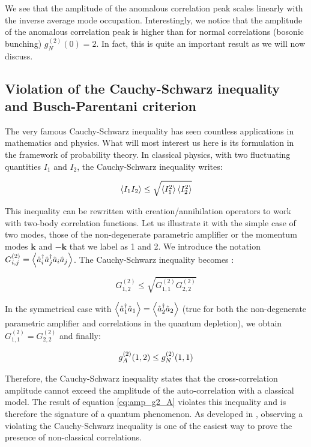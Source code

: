 \noindent We see that the amplitude of the anomalous correlation peak scales linearly with the inverse average mode occupation. Interestingly, we notice that the amplitude of the anomalous correlation peak is higher than for normal correlations (bosonic bunching) $g^{(2)}_N (0)=2$. In fact, this is quite an important result as we will now discuss.

\subsection{Violation of the Cauchy-Schwarz inequality and Busch-Parentani criterion}

\label{sec:cs_inequality}

The very famous Cauchy-Schwarz inequality has seen countless applications in mathematics and physics. What will most interest us here is its formulation in the framework of probability theory. In classical physics, with two fluctuating quantities $I_1$ and $I_2$, the Cauchy-Schwarz inequality writes:

\begin{equation}
    \left\langle I_1 I_2\right\rangle \leq \sqrt{\left\langle I_1^2\right\rangle \left\langle I_2^2\right\rangle}
\end{equation}

This inequality can be rewritten with creation/annihilation operators to work with two-body correlation functions. Let us illustrate it with the simple case of two modes, those of the non-degenerate parametric amplifier or the momentum modes $\bm{k}$ and $-\bm{k}$ that we label as 1 and 2. We introduce the notation $G^{(2)}_{i,j} = \left\langle\hat{a}_i^{\dagger} \hat{a}_j^{\dagger} \hat{a}_i \hat{a}_j\right\rangle$. The Cauchy-Schwarz inequality becomes \cite{kheruntsyan2012violation,walls2008}:

\begin{equation}
    G^{(2)}_{1,2} \leq \sqrt{G^{(2)}_{1,1} G^{(2)}_{2,2} }
\end{equation}

In the symmetrical case with $\left\langle\hat{a}^{\dagger}_1 \hat{a}_1\right\rangle=\left\langle\hat{a}^{\dagger}_2 \hat{a}_2\right\rangle$ (true for both the non-degenerate parametric amplifier and \kmk correlations in the quantum depletion), we obtain $G^{(2)}_{1,1}=G^{(2)}_{2,2}$ and finally:

\begin{equation}
    g^{(2)}_A (1,2) \leq g^{(2)}_N (1,1)
\end{equation}


Therefore, the Cauchy-Schwarz inequality states that the cross-correlation amplitude cannot exceed the amplitude of the auto-correlation with a classical model. The result of equation \ref{eq:amp_g2_A} violates this inequality and is therefore the signature of a quantum phenomenon. As developed in \cite{kheruntsyan2012violation}, observing a violating the Cauchy-Schwarz inequality is one of the easiest way to prove the presence of non-classical correlations.

